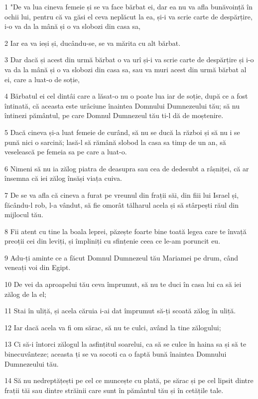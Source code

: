 \par 1 "De va lua cineva femeie și se va face bărbat ei, dar ea nu va afla bunăvoință în ochii lui, pentru că va găsi el ceva neplăcut la ea, și-i va scrie carte de despărțire, i-o va da la mână și o va slobozi din casa sa,
\par 2 Iar ea va ieși și, ducându-se, se va mărita cu alt bărbat.
\par 3 Dar dacă și acest din urmă bărbat o va urî și-i va scrie carte de despărțire și i-o va da la mână și o va slobozi din casa sa, sau va muri acest din urmă bărbat al ei, care a luat-o de soție,
\par 4 Bărbatul ei cel dintâi care a lăsat-o nu o poate lua iar de soție, după ce a fost întinată, că aceasta este urâciune înaintea Domnului Dumnezeului tău; să nu întinezi pământul, pe care Domnul Dumnezeul tău ti-l dă de moștenire.
\par 5 Dacă cineva și-a luat femeie de curând, să nu se ducă la război și să nu i se pună nici o sarcină; lasă-l să rămână slobod la casa sa timp de un an, să veselească pe femeia sa pe care a luat-o.
\par 6 Nimeni să nu ia zălog piatra de deasupra sau cea de dedesubt a râșniței, că ar însemna că iei zălog însăși viața cuiva.
\par 7 De se va afla că cineva a furat pe vreunul din frații săi, din fiii lui Israel și, făcându-l rob, l-a vândut, să fie omorât tălharul acela și să stârpești răul din mijlocul tău.
\par 8 Fii atent cu tine la boala leprei, păzește foarte bine toată legea care te învață preoții cei din leviți, și împliniți cu sfințenie ceea ce le-am poruncit eu.
\par 9 Adu-ți aminte ce a făcut Domnul Dumnezeul tău Mariamei pe drum, când veneați voi din Egipt.
\par 10 De vei da aproapelui tău ceva împrumut, să nu te duci în casa lui ca să iei zălog de la el;
\par 11 Stai în uliță, și acela căruia i-ai dat împrumut să-ți scoată zălog în uliță.
\par 12 Iar dacă acela va fi om sărac, să nu te culci, având la tine zălogului;
\par 13 Ci să-i întorci zălogul la asfințitul soarelui, ca să se culce în haina sa și să te binecuvânteze; aceasta ți se va socoti ca o faptă bună înaintea Domnului Dumnezeului tău.
\par 14 Să nu nedreptățești pe cel ce muncește cu plată, pe sărac și pe cel lipsit dintre frații tăi sau dintre străinii care sunt în pământul tău și în cetățile tale.

